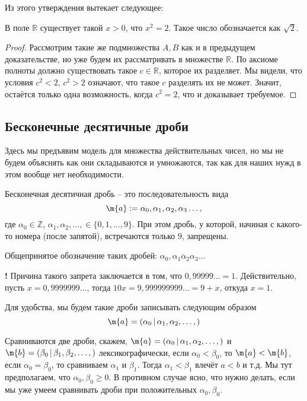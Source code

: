 Из этого утверждения вытекает следующее:

\begin{corollary}
    В поле $\mathbb{R}$ существует такой $x>0$, что $x^2 = 2$. Такое число обозначается как $\sqrt{2}.$
\end{corollary}
\begin{proof}
 Рассмотрим такие же подмножества $A,B$ как и в предыдущем доказательстве, но уже будем их рассматривать в множестве $\mathbb{R}$. По аксиоме полноты должно существовать такое $c\in \mathbb{R}$, которое их разделяет.  Мы видели, что условия $c^2<2$, $c^2>2$ означают, что такое $c$ разделять их не может. Значит, остаётся только одна возможность, когда $c^2 =2$, что и доказывает требуемое.
\end{proof}

\subsection{Бесконечные десятичные дроби}\label{model_of_R}

Здесь мы предъявим модель для множества действительных чисел, но мы не будем объяснять как они складываются и умножаются, так как для наших нужд в этом вообще нет необходимости.


\begin{definition}
    Бесконечная десятичная дробь -- это последовательность вида 
    \[
     \m{a}:=\alpha_0,\alpha_1, \alpha_2, \alpha_3\ldots,
    \]
где $\alpha_0 \in \mathbb{Z}$, $\alpha_1,\alpha_2,\ldots, \in \{0,1,\ldots, 9\}$. При этом дробь, у которой, начиная с какого-то номера (после запятой), встречаются только $9$, запрещены.

Общепринятое обозначение таких дробей: $\overline{\alpha_0,\alpha_1\alpha_2\alpha_3\ldots}$
\end{definition}



\begin{mydanger}{\bf{!}}
    Причина такого запрета заключается в том, что $0,99999\ldots = 1$. Действительно, пусть $x = 0,9999999\ldots$, тогда $10x = 9,999999999\ldots = 9 + x$, откуда $x=1$.
\end{mydanger}

Для удобства, мы будем такие дроби записывать следующим образом
\[
 \m{a} = (\alpha_0 \,|\, \alpha_1, \alpha_2,\ldots,)
\]

Сравниваются две дроби, скажем, $\m{a} = (\alpha_0 \,|\, \alpha_1, \alpha_2,\ldots,)$ и $\m{b} = (\beta_0 \,|\, \beta_1, \beta_2,\ldots,)$ лексикографически, \ie если $\alpha_0<\beta_0$, то $\m{a}<\m{b}$, если $\alpha_0=\beta_0$, то сравниваем $\alpha_1$ и $\beta_1$. Тогда $\alpha_1<\beta_1$ влечёт $a<b$ и т.д. Мы тут предполагаем, что $\alpha_0,\beta_0 \ge 0$. В противном случае ясно, что нужно делать, если мы уже умеем сравнивать дроби при положительных $\alpha_0,\beta_0.$

